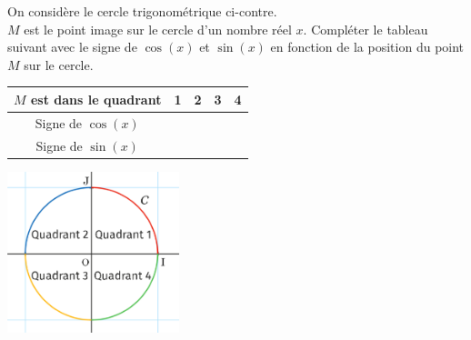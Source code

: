 \documentclass[a4paper,11pt,exos]{nsi} %
\begin{document}
\exo{}
\begin{minipage}{12cm}
	On considère le cercle trigonométrique ci-contre.\\
	$M$ est le point image sur le cercle d'un nombre réel $x$. Compléter le tableau suivant avec le signe de $\cos(x)$ et $\sin(x)$ en fonction de la position du point $M$ sur le cercle.
	\begin{center}
		\begin{tabular}{|c|c|c|c|c|}
			\hline
			\cellcolor{UGLiOrange}$M$ est dans le quadrant & 1 & 2 & 3 & 4\\
			\hline
			\cellcolor{UGLiOrange}Signe de $\cos(x)$ & \hspace{1cm} & \hspace{1cm} & \hspace{1cm} & \hspace{1cm} \\
			\hline
			\cellcolor{UGLiOrange}Signe de $\sin(x)$ & \hspace{1cm} & \hspace{1cm} & \hspace{1cm} & \hspace{1cm} \\
			\hline
		\end{tabular}
	\end{center}
\end{minipage}
\begin{minipage}{5cm}
	\includegraphics[width=5cm]{quadrants}
\end{minipage}
\end{document}

